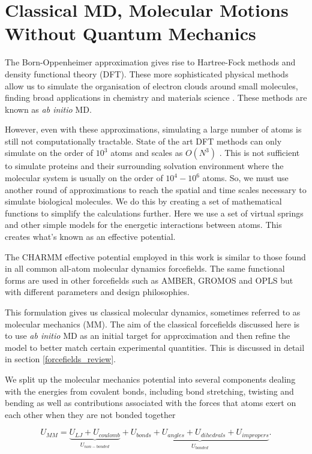 \section{Classical MD, Molecular Motions Without Quantum Mechanics}
The Born-Oppenheimer approximation gives rise to Hartree-Fock methods and density functional theory (DFT). These more sophisticated physical methods allow us to simulate the organisation of electron clouds around small molecules, finding broad applications in chemistry and materials science \cite{vanmourik2014}. These methods are known as \textit{ab initio} MD. 

However, even with these approximations, simulating a large number of atoms is still not computationally tractable. State of the art DFT methods can only simulate on the order of $10^3$ atoms \cite{luo2020} and scales as $O(N^3)$ \cite{kresse1996}. This is not sufficient to simulate proteins and their surrounding solvation environment where the molecular system is usually on the order of $10^4-10^6$ atoms. So, we must use another round of approximations to reach the spatial and time scales necessary to simulate biological molecules. We do this by creating a set of mathematical functions to simplify the calculations further. Here we use a set of virtual springs and other simple models for the energetic interactions between atoms. This creates what's known as an effective potential. 


The CHARMM effective potential employed in this work is similar to those found in all common all-atom molecular dynamics forcefields. The same  functional forms are used in other forcefields such as AMBER, GROMOS and OPLS but with different parameters and design philosophies\cite{lemkul2020}. 

This formulation gives us classical molecular dynamics, sometimes referred to as molecular mechanics (MM). The aim of the classical forcefields discussed here is to use \textit {ab initio} MD as an initial target for approximation and then refine the model to better match certain experimental quantities. This is discussed in detail in section \ref{forcefields_review}.

We split up the molecular mechanics potential into several components dealing with the energies from covalent bonds, including bond stretching, twisting and bending as well as contributions associated with the forces that atoms exert on each other when they are not bonded together 

\begin{equation}
	U_{MM} = \underbrace{U_{LJ} + U_{coulomb}}_{U_{non-bonded}} + \underbrace{U_{bonds} + U_{angles} + U_{dihedrals} + U_{impropers}}_{U_{bonded} }.
	\label{CHARMM_effective_potential_eq}
\end{equation}

